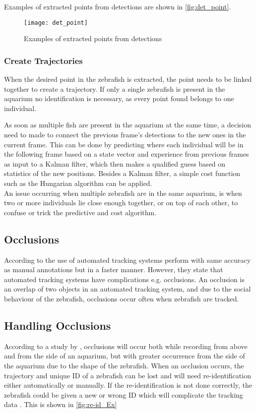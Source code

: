 Examples of extracted points from detections are shown in \autoref{fig:det_point}.

\begin{figure}[H]
	\centering
	\texttt{[image: det\_point]}
	\caption{Examples of extracted points from detections}
	\label{fig:det_point}
\end{figure}

\subsubsection{Create Trajectories}
When the desired point in the zebrafish is extracted, the point needs to be linked together to create a trajectory. If only a single zebrafish is present in the aquarium no identification is necessary, as every point found belongs to one individual.

As soon as multiple fish are present in the aquarium at the same time, a decision need to made to connect the previous frame's detections to the new ones in the current frame. This can be done by predicting where each individual will be in the following frame based on a state vector and experience from previous frames as input to a Kalman filter, which then makes a qualified guess based on statistics of the new positions. Besides a Kalman filter, a simple cost function such as the Hungarian algorithm can be applied.\\

An issue occurring when multiple zebrafish are in the same aquarium, is when two or more individuals lie close enough together, or on top of each other, to confuse or trick the predictive and cost algorithm.

\subsection{Occlusions}
According to  \cite{Green2012} the use of automated tracking systems perform with same accuracy as manual annotations but in a faster manner. However, they state that automated tracking systems have complications e.g. occlusions. An occlusion is an overlap of two objects in an automated tracking system, and due to the social behaviour of the zebrafish, occlusions occur often when zebrafish are tracked.

\subsection{Handling Occlusions}
According to a study by \cite{Qian2017}, occlusions will occur both while recording from above and from the side of an aquarium, but with greater occurrence from the side of the aquarium due to the shape of the zebrafish. When an occlusion occurs, the trajectory and unique ID of a zebrafish can be lost and will need re-identification either automatically or manually. If the re-identification is not done correctly, the zebrafish could be given a new or wrong ID which will complicate the tracking data \citep{Feijo2018}. This is shown in \autoref{fig:re-id_Ex}

